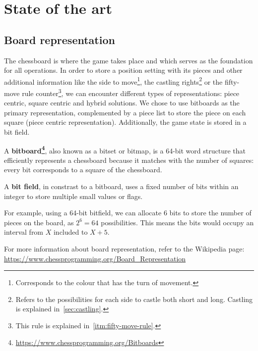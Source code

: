 \chapter{State of the art}
\label{cap:estadoDeLaCuestion}

\section{Board representation}

The chessboard is where the game takes place and which serves as the foundation for all operations. In order to store a position setting with its pieces and other additional information like the side to move\footnote{Corresponds to the colour that has the turn of movement.}, the castling rights\footnote{Refers to the possibilities for each side to castle both short and long. Castling is explained in~\ref{sec:castling}.} or the fifty-move rule counter\footnote{This rule is explained in~\ref{itm:fifty-move-rule}.}, we can encounter different types of representations: piece centric, square centric and hybrid solutions. We chose to use bitboards as the primary representation, complemented by a piece list to store the piece on each square (piece centric representation). Additionally, the game state is stored in a bit field.

\vspace{1em}

A \textbf{bitboard\footnote{\url{https://www.chessprogramming.org/Bitboards}}}, also known as a bitset or bitmap, is a 64-bit word structure that efficiently represents a  chessboard because it matches with the number of squares: every bit corresponds to a square of the chessboard.

\vspace{1em}

A \textbf{bit field}, in constrast to a bitboard, uses a fixed number of bits within an integer to store multiple small values or flags.

\vspace{1em}

For example, using a 64-bit bitfield, we can allocate 6 bits to store the number of pieces on the board, as $2^6 = 64$ possibilities. This means the bits would occupy an interval from $X$ included to $X+5$.

\vspace{1em}

For more information about board representation, refer to the Wikipedia page: \url{https://www.chessprogramming.org/Board_Representation}

